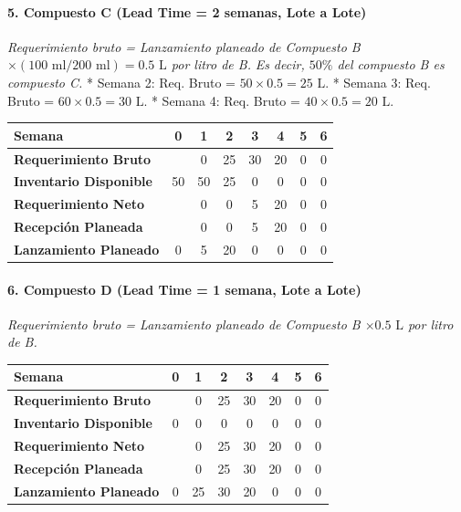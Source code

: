 \documentclass[
]{article}
\begin{document}
\hypertarget{compuesto-c-lead-time-2-semanas-lote-a-lote}{%
\paragraph{5. Compuesto C (Lead Time = 2 semanas, Lote a
Lote)}\label{compuesto-c-lead-time-2-semanas-lote-a-lote}}

\emph{Requerimiento bruto = Lanzamiento planeado de Compuesto B
\(\times (100\text{ ml} / 200\text{ ml}) = 0.5\text{ L}\) por litro de
B.} \emph{Es decir, \(50\%\) del compuesto B es compuesto C.} * Semana
2: Req. Bruto = \(50 \times 0.5 = 25\text{ L}\). * Semana 3: Req. Bruto
= \(60 \times 0.5 = 30\text{ L}\). * Semana 4: Req. Bruto =
\(40 \times 0.5 = 20\text{ L}\).

\begin{longtable}[]{@{}lccccccc@{}}
\toprule\noalign{}
Semana & 0 & 1 & 2 & 3 & 4 & 5 & 6 \\
\midrule\noalign{}
\endhead
\bottomrule\noalign{}
\endlastfoot
\textbf{Requerimiento Bruto} & & 0 & 25 & 30 & 20 & 0 & 0 \\
\textbf{Inventario Disponible} & 50 & 50 & 25 & 0 & 0 & 0 & 0 \\
\textbf{Requerimiento Neto} & & 0 & 0 & 5 & 20 & 0 & 0 \\
\textbf{Recepción Planeada} & & 0 & 0 & 5 & 20 & 0 & 0 \\
\textbf{Lanzamiento Planeado} & 0 & 5 & 20 & 0 & 0 & 0 & 0 \\
\end{longtable}

\hypertarget{compuesto-d-lead-time-1-semana-lote-a-lote}{%
\paragraph{6. Compuesto D (Lead Time = 1 semana, Lote a
Lote)}\label{compuesto-d-lead-time-1-semana-lote-a-lote}}

\emph{Requerimiento bruto = Lanzamiento planeado de Compuesto B
\(\times 0.5\text{ L}\) por litro de B.}

\begin{longtable}[]{@{}lccccccc@{}}
\toprule\noalign{}
Semana & 0 & 1 & 2 & 3 & 4 & 5 & 6 \\
\midrule\noalign{}
\endhead
\bottomrule\noalign{}
\endlastfoot
\textbf{Requerimiento Bruto} & & 0 & 25 & 30 & 20 & 0 & 0 \\
\textbf{Inventario Disponible} & 0 & 0 & 0 & 0 & 0 & 0 & 0 \\
\textbf{Requerimiento Neto} & & 0 & 25 & 30 & 20 & 0 & 0 \\
\textbf{Recepción Planeada} & & 0 & 25 & 30 & 20 & 0 & 0 \\
\textbf{Lanzamiento Planeado} & 0 & 25 & 30 & 20 & 0 & 0 & 0 \\
\end{longtable}
\end{document}
